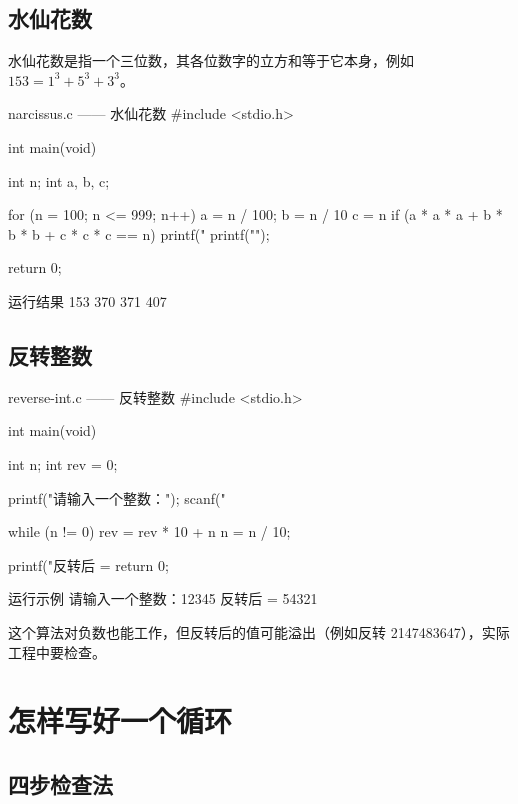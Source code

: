 \subsection{水仙花数}

水仙花数是指一个三位数，其各位数字的立方和等于它本身，例如 $153 = 1^3 + 5^3 + 3^3$。

\begin{codebox}{narcissus.c —— 水仙花数}
#include <stdio.h>

int main(void)
{
    int n;
    int a, b, c;

    for (n = 100; n <= 999; n++) {
        a = n / 100;
        b = n / 10 %
        c = n %
        if (a * a * a + b * b * b + c * c * c == n) {
            printf("%
        }
    }
    printf("\n");

    return 0;
}
\end{codebox}

\begin{outbox}{运行结果}
153 370 371 407
\end{outbox}

\subsection{反转整数}

\begin{codebox}{reverse-int.c —— 反转整数}
#include <stdio.h>

int main(void)
{
    int n;
    int rev = 0;

    printf("请输入一个整数：");
    scanf("%

    while (n != 0) {
        rev = rev * 10 + n %
        n = n / 10;
    }

    printf("反转后 = %
    return 0;
}
\end{codebox}

\begin{outbox}{运行示例}
请输入一个整数：12345
反转后 = 54321
\end{outbox}

这个算法对负数也能工作，但反转后的值可能溢出（例如反转 2147483647），实际工程中要检查。

\section{怎样写好一个循环}

\subsection{四步检查法}

